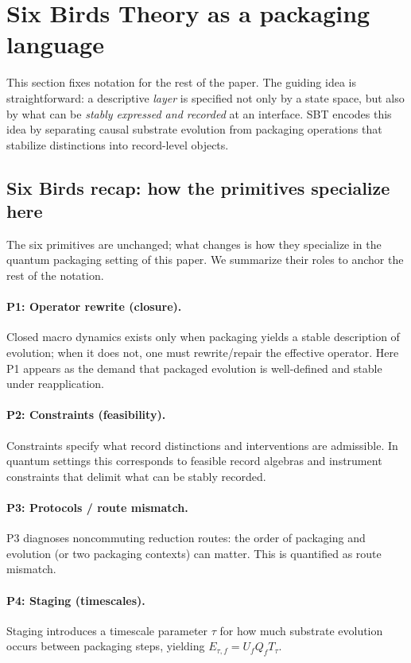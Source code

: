 \section{Six Birds Theory as a packaging language}\label{sec:sbt}

This section fixes notation for the rest of the paper. The guiding idea is straightforward:
a descriptive \emph{layer} is specified not only by a state space, but also by what can be \emph{stably expressed and recorded} at an interface.
SBT encodes this idea by separating causal substrate evolution from packaging operations that stabilize distinctions into record-level objects.\cite{Tsiokos2026SixBirds}

\subsection{Six Birds recap: how the primitives specialize here}

The six primitives are unchanged; what changes is how they specialize in the quantum packaging setting of this paper. We summarize their roles to anchor the rest of the notation.

\paragraph{P1: Operator rewrite (closure).}
Closed macro dynamics exists only when packaging yields a stable description of evolution; when it does not, one must rewrite/repair the effective operator. Here P1 appears as the demand that packaged evolution is well-defined and stable under reapplication.

\paragraph{P2: Constraints (feasibility).}
Constraints specify what record distinctions and interventions are admissible. In quantum settings this corresponds to feasible record algebras and instrument constraints that delimit what can be stably recorded.

\paragraph{P3: Protocols / route mismatch.}
P3 diagnoses noncommuting reduction routes: the order of packaging and evolution (or two packaging contexts) can matter. This is quantified as route mismatch.

\paragraph{P4: Staging (timescales).}
Staging introduces a timescale parameter $\tau$ for how much substrate evolution occurs between packaging steps, yielding $E_{\tau,f}=U_f Q_f T_\tau$.

